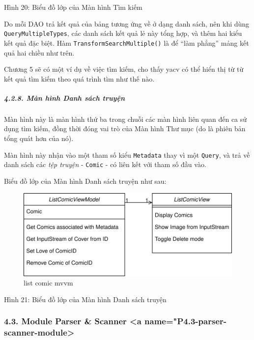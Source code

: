 \documentclass[
]{article}
\begin{document}
Hình 20: Biểu đồ lớp của Màn hình Tìm kiếm

Do mỗi DAO trả kết quả của bảng tương ứng về ở dạng danh sách, nên khi
dùng \texttt{QueryMultipleTypes}, các danh sách kết quả lẻ này tổng hợp,
và thêm hai kiểu kết quả đặc biệt. Hàm
\texttt{TransformSearchMultiple()} là để ``làm phẳng'' mảng kết quả hai
chiều như trên.

Chương 5 sẽ có một ví dụ về việc tìm kiếm, cho thấy yacv có thể hiển thị
từ từ kết quả tìm kiếm theo quá trình tìm như thế nào.

\hypertarget{muxe0n-huxecnh-danh-suxe1ch-truyux1ec7n}{%
\subparagraph{\texorpdfstring{4.2.8. Màn hình Danh sách truyện
}{4.2.8. Màn hình Danh sách truyện }}\label{muxe0n-huxecnh-danh-suxe1ch-truyux1ec7n}}

Màn hình này là màn hình thứ ba trong chuỗi các màn hình liên quan đến
ca sử dụng tìm kiếm, đồng thời đóng vai trò của Màn hình Thư mục (do là
phiên bản tổng quát hơn của nó).

Màn hình này nhận vào một tham số kiểu \texttt{Metadata} thay vì một
\texttt{Query}, và trả về danh sách các \emph{tệp truyện} -
\texttt{Comic} - có liên kết với tham số đầu vào.

Biểu đồ lớp của Màn hình Danh sách truyện như sau:

\begin{figure}
\centering
\includegraphics{../images/list_comics_mvvm_class.svg}
\caption{list comic mvvm}
\end{figure}

Hình 21: Biểu đồ lớp của Màn hình Danh sách truyện

\hypertarget{module-parser-scanner-a-namep4.3-parser-scanner-module}{%
\subsubsection{4.3. Module Parser \& Scanner \textless a
name="P4.3-parser-scanner-module\textgreater{}}\label{module-parser-scanner-a-namep4.3-parser-scanner-module}}
\end{document}
